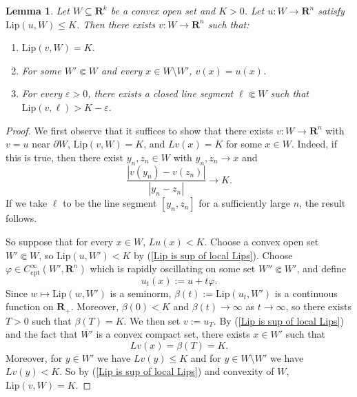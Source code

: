 \documentclass[reqno,11pt]{amsart}
\newcommand{\RR}{\mathbf{R}}
\newcommand{\Lip}{\mathrm{Lip}}
\newcommand{\cpt}{\mathrm{cpt}}
\newtheorem{lemma}[theorem]{Lemma}
\theoremstyle{definition}
\numberwithin{equation}{section}
\begin{document}
\begin{lemma}\label{improvement on one ball}
Let $W \subseteq \RR^k$ be a convex open set and $K > 0$.
Let $u: W \to \RR^n$ satisfy $\Lip(u, W) \leq K$.
Then there exists $v: W \to \RR^n$ such that:
\begin{enumerate}
\item $\Lip(v, W) = K$.
\item For some $W' \Subset W$ and every $x \in W \setminus W'$, $v(x) = u(x)$.
\item For every $\varepsilon > 0$, there exists a closed line segment $\ell \Subset W$ such that $\Lip(v, \ell) > K - \varepsilon$.
\end{enumerate}
\end{lemma}
\begin{proof}
We first observe that it suffices to show that there exists $v: W \to \RR^n$ with $v = u$ near $\partial W$, $\Lip(v, W) = K$, and $Lv(x) = K$ for some $x \in W$.
Indeed, if this is true, then there exist $y_n, z_n \in W$ with $y_n, z_n \to x$ and
$$\frac{|v(y_n) - v(z_n)|}{|y_n - z_n|} \to K.$$
If we take $\ell$ to be the line segment $[y_n, z_n]$ for a sufficiently large $n$, the result follows.

So suppose that for every $x \in W$, $Lu(x) < K$.
Choose a convex open set $W' \Subset W$, so $\Lip(u, W') < K$ by (\ref{Lip is sup of local Lips}).
Choose $\varphi \in C^\infty_\cpt(W', \RR^n)$ which is rapidly oscillating on some set $W'' \Subset W'$, and define
$$u_t(x) := u + t\varphi.$$
Since $w \mapsto \Lip(w, W')$ is a seminorm, $\beta(t) := \Lip(u_t, W')$ is a continuous function on $\RR_+$.
Moreover, $\beta(0) < K$ and $\beta(t) \to \infty$ as $t \to \infty$, so there exists $T > 0$ such that $\beta(T) = K$.
We then set $v := u_T$.
By (\ref{Lip is sup of local Lips}) and the fact that $\overline{W'}$ is a convex compact set, there exists $x \in W'$ such that
$$Lv(x) = \beta(T) = K.$$
Moreover, for $y \in W'$ we have $Lv(y) \leq K$ and for $y \in W \setminus W'$ we have $Lv(y) < K$.
So by (\ref{Lip is sup of local Lips}) and convexity of $W$, $\Lip(v, W) = K$.
\end{proof}
\end{document}
